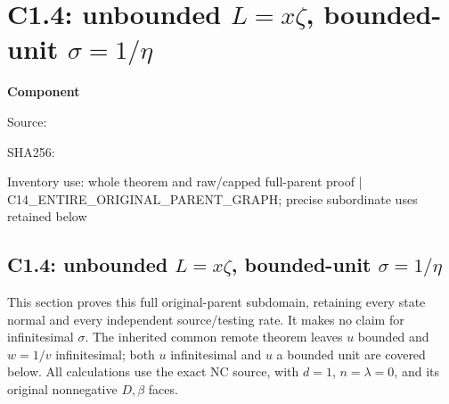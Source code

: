 \chapter{C1.4: unbounded $L=x\zeta$, bounded-unit $\sigma=1/\eta$}
\label{component:pd4b92bf7de71}
\noindent\textbf{Component }\par
{\small\noindent Source: \par}
{\small\noindent SHA256: \par}
{\small\noindent Inventory use: whole theorem and raw/capped full-parent proof | C14\_\allowbreak{}ENTIRE\_\allowbreak{}ORIGINAL\_\allowbreak{}PARENT\_\allowbreak{}GRAPH; precise subordinate uses retained below\par}
\medskip
\section[C1.4: unbounded L, bounded-unit sigma]{C1.4: unbounded $L=x\zeta$, bounded-unit $\sigma=1/\eta$}
\label{pd4b92bf7de71:sec:c14-large-l-unit}
This section proves this full original-parent subdomain, retaining every
state normal and every independent source/testing rate. It makes no claim
for infinitesimal $\sigma$. The inherited common remote theorem leaves
$u$ bounded and $w=1/v$ infinitesimal; both $u$ infinitesimal and $u$ a
bounded unit are covered below. All calculations use the exact NC source,
with $d=1$, $n=\lambda=0$, and its original nonnegative $D,\beta$ faces.

